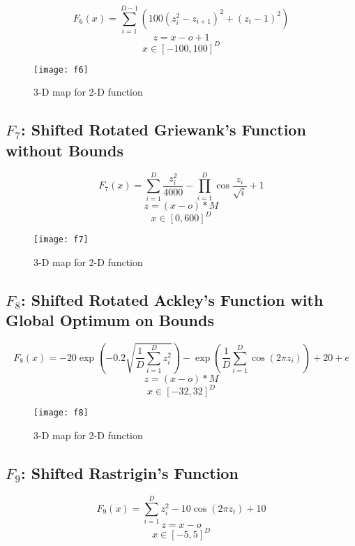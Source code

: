\begin{equation}
  F_6(x)=\sum_{i=1}^{D-1}{(100(z_i^2 - z_{i+1})^2 + (z_i - 1)^2)}
\end{equation}
\[ z=x-o+1 \]
\[ x \in [-100,100]^D \]

\begin{figure}[H]
  \centering
  \texttt{[image: f6]}
  \caption{3-D map for 2-D function}
  \label{f6}
\end{figure}

\subsection{$F_7$: Shifted Rotated Griewank’s Function without Bounds}

\begin{equation}
  F_7(x)=\sum_{i=1}^{D}{\frac{z_i^2}{4000}}-\prod_{i=1}^{D}{\cos{\frac{z_i}{\sqrt{i}}}}+1
\end{equation}
\[ z=(x-o)*M \]
\[ x \in [0,600]^D \]

\begin{figure}[H]
  \centering
  \texttt{[image: f7]}
  \caption{3-D map for 2-D function}
  \label{f7}
\end{figure}

\subsection{$F_8$: Shifted Rotated Ackley’s Function with Global Optimum on Bounds}

\begin{equation}
  F_8(x)=-20\exp{(-0.2\sqrt{\frac{1}{D}\sum_{i=1}^{D}{z_i^2}})}-\exp{(\frac{1}{D}\sum_{i=1}^{D}{\cos{(2\pi z_i)}})} + 20 + e
\end{equation}
\[ z=(x-o)*M \]
\[ x \in [-32,32]^D \]

\begin{figure}[H]
  \centering
  \texttt{[image: f8]}
  \caption{3-D map for 2-D function}
  \label{f8}
\end{figure}

\subsection{$F_9$: Shifted Rastrigin’s Function}

\begin{equation}
  F_9(x)=\sum_{i=1}^{D}{z_i^2 - 10\cos{(2\pi z_i)} + 10}
\end{equation}
\[ z=x-o \]
\[ x \in [-5,5]^D \]

